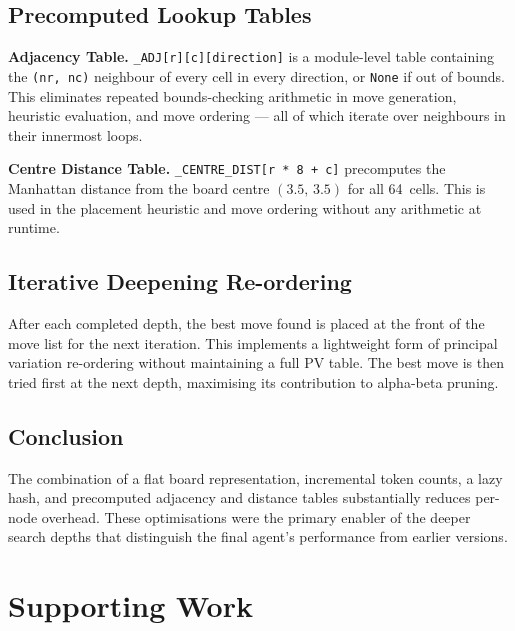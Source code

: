 \documentclass[10pt,a4paper]{article}
\begin{document}
\subsection{Precomputed Lookup Tables}

\textbf{Adjacency Table.}
\texttt{\_ADJ[r][c][direction]} is a module-level table containing the \texttt{(nr, nc)} neighbour of every cell in every direction, or \texttt{None} if out of bounds. This eliminates repeated bounds-checking arithmetic in move generation, heuristic evaluation, and move ordering --- all of which iterate over neighbours in their innermost loops.

\textbf{Centre Distance Table.}
\texttt{\_CENTRE\_DIST[r * 8 + c]} precomputes the Manhattan distance from the board centre $(3.5,\,3.5)$ for all 64~cells. This is used in the placement heuristic and move ordering without any arithmetic at runtime.

\subsection{Iterative Deepening Re-ordering}

After each completed depth, the best move found is placed at the front of the move list for the next iteration. This implements a lightweight form of principal variation re-ordering without maintaining a full PV table. The best move is then tried first at the next depth, maximising its contribution to alpha-beta pruning.

\subsection{Conclusion}

The combination of a flat board representation, incremental token counts, a lazy hash, and precomputed adjacency and distance tables substantially reduces per-node overhead. These optimisations were the primary enabler of the deeper search depths that distinguish the final agent's performance from earlier versions.

\section{Supporting Work}
\label{sec:supporting}
\end{document}
